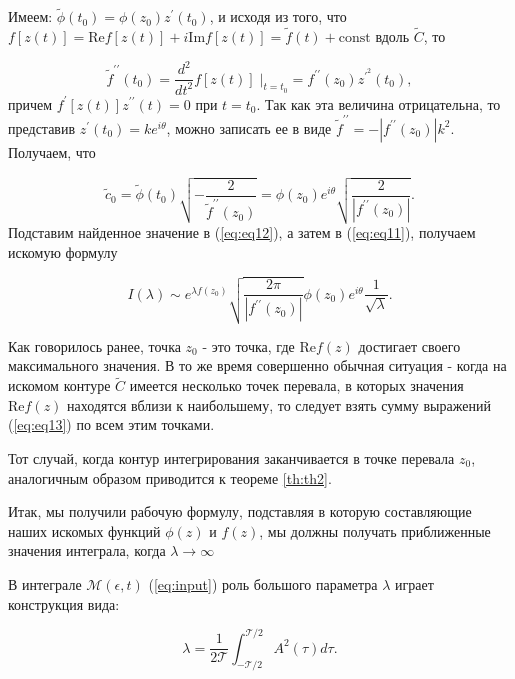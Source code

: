 \documentclass[%
bachelor,    %
natbib,      %
subf,        %
href,        %
colorlinks,  %
]{disser}
\renewcommand{\Re}{\mathrm{Re}}
\renewcommand{\Im}{\mathrm{Im}}
\newcommand{\const}{\mathrm{const}}
\newcommand{\cM}{\mathcal{M}}
\newcommand{\cT}{\mathcal{T}}
\begin{document}
	Имеем: $\widetilde{\phi}(t_0) = \phi(z_0) z^\prime (t_0)$, и исходя из того, что $f[z(t)] = \Re f[z(t)]+ i \Im f[z(t)] = \widetilde{f}(t)+\const$ вдоль $\widetilde{C}$, то
	
	\begin{equation}\nonumber
	\widetilde{f}^{\prime\prime} (t_0) = \frac{d^2}{d t^2} f[z(t)]\;|_{t=t_0} = f^{\prime\prime} (z_0) z^{\prime^2} (t_0),
	\end{equation}
	причем $f^\prime[z(t)] z^{\prime \prime} (t) = 0$ при $t=t_0$. Так как эта величина отрицательна, то представив $z^\prime (t_0) = k e^{i \theta}$, можно записать ее в виде $\widetilde{f}^{\prime\prime}=-|f^{\prime\prime}(z_0)| k^2$. Получаем, что 
	
	\begin{equation}\nonumber
	\widetilde{c}_0=\widetilde{\phi}(t_0) \sqrt{-\frac{2}{\widetilde{f}^{\prime\prime}(z_0)}}= \phi (z_0) e^{i \theta} \sqrt{\frac{2}{|f^{\prime\prime}(z_0)|}}.
	\end{equation}
	Подставим найденное значение в (\ref{eq:eq12}), а затем в (\ref{eq:eq11}), получаем искомую формулу
	
	\begin{equation}\label{eq:eq13}
	I(\lambda) \sim e^{\lambda f (z_0)}\sqrt{\frac{2\pi}{|f^{\prime \prime} (z_0)|}} \phi(z_0) e^{i \theta} \frac{1}{\sqrt{\lambda}}.
	\end{equation}
	
	Как говорилось ранее, точка $z_0$ - это точка, где $\Re f(z)$ достигает своего максимального значения. В то же время совершенно обычная ситуация - когда на искомом контуре $\widetilde{C}$ имеется несколько точек перевала, в которых значения $\Re f (z)$ находятся вблизи к наибольшему, то следует взять сумму выражений (\ref{eq:eq13}) по всем этим точками. 
	
	Тот случай, когда контур интегрирования заканчивается в точке перевала $z_0$, аналогичным образом приводится к теореме \ref{th:th2}.
	
	Итак, мы получили рабочую формулу, подставляя в которую составляющие наших искомых функций $\phi (z)$ и $f (z)$, мы должны получать приближенные значения интеграла, когда $\lambda \rightarrow \infty$ 
	
	В интеграле $\cM(\epsilon,t)$ (\ref{eq:input}) роль большого параметра $\lambda$ играет конструкция вида:
	
	\begin{equation}\label{eq.lambda}
	\lambda = \frac{1}{2 \cT} \int_{-\cT/2}^{\cT/2} A^2(\tau) d\tau.
	\end{equation}
\end{document}
